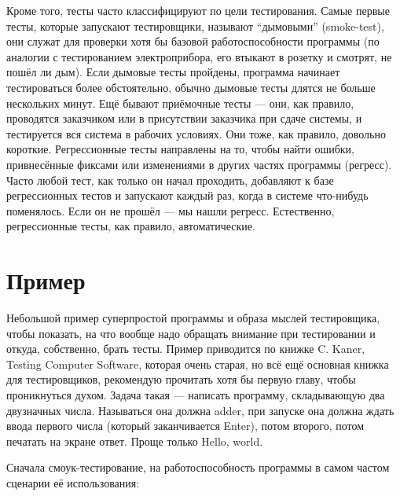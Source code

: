 \documentclass{../../text-style}
\begin{document}
Кроме того, тесты часто классифицируют по цели тестирования. Самые первые тесты, которые запускают тестировщики, называют \enquote{дымовыми} (smoke-test), они служат для проверки хотя бы базовой работоспособности программы (по аналогии с тестированием электроприбора, его втыкают в розетку и смотрят, не пошёл ли дым). Если дымовые тесты пройдены, программа начинает тестироваться более обстоятельно, обычно дымовые тесты длятся не больше нескольких минут. Ещё бывают приёмочные тесты --- они, как правило, проводятся заказчиком или в присутствии заказчика при сдаче системы, и тестируется вся система в рабочих условиях. Они тоже, как правило, довольно короткие. Регрессионные тесты направлены на то, чтобы найти ошибки, привнесённые фиксами или изменениями в других частях программы (регресс). Часто любой тест, как только он начал проходить, добавляют к базе регрессионных тестов и запускают каждый раз, когда в системе что-нибудь поменялось. Если он не прошёл --- мы нашли регресс. Естественно, регрессионные тесты, как правило, автоматические.

\section{Пример}

Небольшой пример суперпростой программы и образа мыслей тестировщика, чтобы показать, на что вообще надо обращать внимание при тестировании и откуда, собственно, брать тесты. Пример приводится по книжке C. Kaner, Testing Computer Software, которая очень старая, но всё ещё основная книжка для тестировщиков, рекомендую прочитать хотя бы первую главу, чтобы проникнуться духом. Задача такая --- написать программу, складывающую два двузначных числа. Называться она должна adder, при запуске она должна ждать ввода первого числа (который заканчивается Enter), потом второго, потом печатать на экране ответ. Проще только Hello, world.

Сначала смоук-тестирование, на работоспособность программы в самом частом сценарии её использования: 
\end{document}
